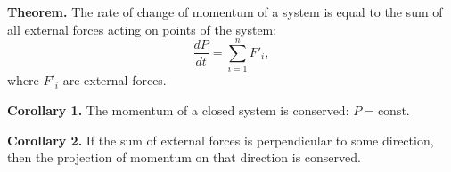 \textbf{Theorem.} The rate of change of momentum of a system is equal to the sum of all external forces acting on points of the system:
$$\frac{dP}{dt} = \sum_{i=1}^{n} F'_i,$$
where $F'_i$ are external forces.

\textbf{Corollary 1.} The momentum of a closed system is conserved: $P = \text{const}$.

\textbf{Corollary 2.} If the sum of external forces is perpendicular to some direction, then the projection of momentum on that direction is conserved.

